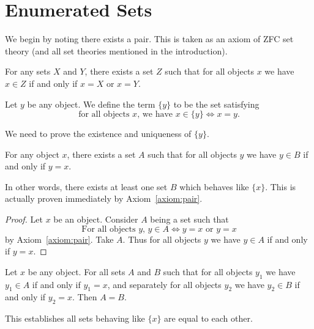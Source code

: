 \section{Enumerated Sets}

We begin by noting there exists a pair. This is taken as an axiom of ZFC
set theory (and all set theories mentioned in the introduction).

\begin{axiom}[Pair]\label{axiom:pair}
For any sets $X$ and $Y$, there exists a set $Z$ such that for all
objects $x$ we have $x\in Z$ if and only if $x=X$ or $x=Y$.
\end{axiom}

\begin{definition}
Let $y$ be any object. We define the term $\{y\}$ to be the set
satisfying
\begin{equation}\label{enum:def:singleton}
\mbox{for all objects $x$, we have }x\in\{y\}\iff x=y.
\end{equation}
\end{definition}

We need to prove the existence and uniqueness of $\{y\}$.

\begin{theorem}[Existence]
For any object $x$, there exists a set $A$ such that for all objects $y$
we have $y\in B$ if and only if $y=x$.
\end{theorem}

In other words, there exists at least one set $B$ which behaves like $\{x\}$.
This is actually proven immediately by Axiom~\ref{axiom:pair}.

\begin{proof}
Let $x$ be an object. Consider $A$ being a set such that
\begin{equation}
\mbox{For all objects $y$, }y\in A\iff y=x\mbox{ or }y=x
\end{equation}
by Axiom~\ref{axiom:pair}. Take $A$.
Thus for all objects $y$ we have $y\in A$ if and only if $y=x$.
\end{proof}

\begin{theorem}[Uniqueness]
Let $x$ be any object. For all sets $A$ and $B$ such that for all
objects $y_{1}$ we have $y_{1}\in A$ if and only if $y_{1}=x$, and
separately for all objects $y_{2}$ we have $y_{2}\in B$ if and only if $y_{2}=x$.
Then $A=B$.
\end{theorem}

This establishes all sets behaving like $\{x\}$ are equal to each other. 

